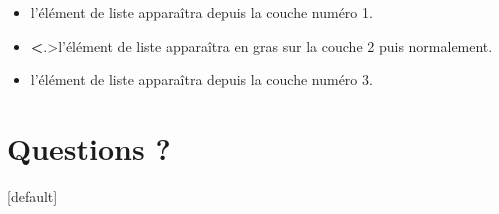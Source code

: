 \documentclass[utf8]{beamer}
\begin{document}
\begin{frame}
\begin{itemize}[<+->]
    \item l'élément de liste apparaîtra depuis la couche numéro 1.
    \item \textbf<.>{l'élément de liste apparaîtra en gras 
                    sur la couche 2 puis normalement.}
    \item l'élément de liste apparaîtra depuis la couche numéro 3.  
  \end{itemize}
\end{frame}

\section{Questions ?}

[default]
\begin{frame}
\end{frame}
\end{document}
